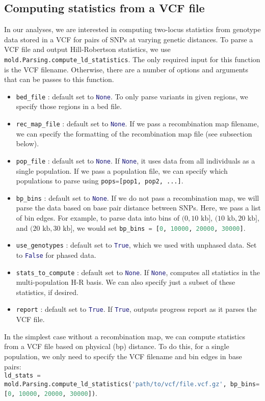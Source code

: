 \documentclass[10pt]{article}
\makeatletter
\newcommand{\py}[1]{\lstinline[breaklines=true,language=Python, showstringspaces=False]@#1@}
\makeatother
\begin{document}
\subsection{Computing statistics from a VCF file}

In our analyses, we are interested in computing two-locus statistics from genotype data stored in a VCF for pairs of SNPs at varying genetic distances.
To parse a VCF file and output Hill-Robertson statistics, we use \py{mold.Parsing.compute_ld_statistics}.
The only required input for this function is the VCF filename.
Otherwise, there are a number of options and arguments that can be passes to this function.
\begin{itemize}
\item \py{bed_file} : default set to \py{None}. To only parse variants in given regions, we specify those regions in a bed file.
\item \py{rec_map_file} : default set to \py{None}. If we pass a recombination map filename, we can specify the formatting of the recombination map file (see subsection below).
\item \py{pop_file} : default set to \py{None}. If \py{None}, it uses data from all individuals as a single population. If we pass a population file, we can specify which populations to parse using \py{pops=[pop1, pop2, ...]}.
\item \py{bp_bins} : default set to \py{None}. If we do not pass a recombination map, we will parse the data based on base pair distance between SNPs. Here, we pass a list of bin edges. For example, to parse data into bins of $(0,10\text{ kb}]$, $(10\text{ kb},20\text{ kb}]$, and $(20\text{ kb},30\text{ kb}]$, we would set \py{bp_bins = [0, 10000, 20000, 30000]}.
\item \py{use_genotypes} : default set to \py{True}, which we used with unphased data. Set to \py{False} for phased data.
\item \py{stats_to_compute} : default set to \py{None}. If \py{None}, computes all statistics in the multi-population H-R basis. We can also specify just a subset of these statistics, if desired.
\item \py{report} : default set to \py{True}. If \py{True}, outputs progress report as it parses the VCF file.
\end{itemize}

In the simplest case without a recombination map, we can compute statistics from a VCF file based on physical (bp) distance.
To do this, for a single population, we only need to specify the VCF filename and bin edges in base pairs:\\
\py{ld_stats = mold.Parsing.compute_ld_statistics('path/to/vcf/file.vcf.gz', bp_bins=[0, 10000, 20000, 30000])}.
\end{document}
